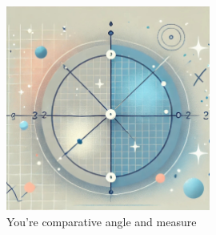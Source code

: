 \documentclass[
  12 pt,
  a4paper,
]{book}
\numberwithin{equation}{section}
\theoremstyle{plain}      %
\theoremstyle{definition} %
\theoremstyle{remark}     %
\theoremstyle{note}         %
\begin{document}
\hfill\break

\begin{figure}[h!]
  \begin{center}
    \includegraphics[width=0.6\textwidth]{pictures/Whimsical-6-cosine_similarity.jpeg}
    \caption*{\Large You're comparative angle and measure}
  \end{center}
\end{figure}

\newpage
\end{document}
